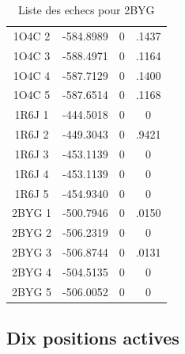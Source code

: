 \documentclass[a4paper,12pt]{article}
\begin{document}
\begin{table}[!htbp]
\begin{tabular}{|c|c|c|c|}
   1O4C 2 & -584.8989 & 0 & .1437 \\
   1O4C 3 & -588.4971 & 0 & .1164 \\
   1O4C 4 & -587.7129 & 0 & .1400 \\
   1O4C 5 & -587.6514 & 0 & .1168 \\
   1R6J 1 & -444.5018 & 0 & 0 \\
   1R6J 2 & -449.3043 & 0 & .9421 \\
   1R6J 3 & -453.1139 & 0 & 0 \\
   1R6J 4 & -453.1139 & 0 & 0 \\
   1R6J 5 & -454.9340 & 0 & 0 \\
   2BYG 1 & -500.7946 & 0 & .0150 \\
   2BYG 2 & -506.2319 & 0 & 0 \\
   2BYG 3 & -506.8744 & 0 & .0131 \\
   2BYG 4 & -504.5135 & 0 & 0 \\
   2BYG 5 & -506.0052 & 0 & 0 \\
   
   \hline

 \end{tabular}      
 \caption{Liste des echecs pour 2BYG }
 \label{tab_echec2BYG__1}      
\end{table}


   \subsection{ Dix positions actives}
\end{document}
